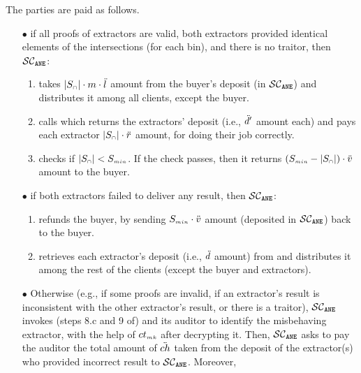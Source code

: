



\item The parties are paid as follows. 

\begin{itemize}[leftmargin=1.7mm]
%
\item[$\bullet$]  if all proofs of  extractors are valid, both extractors provided identical elements of the intersections (for each bin), and there is no traitor, then $\mathcal{SC}_{\mathtt{ANE}}$:
\begin{enumerate}[leftmargin=4.3mm]
%
 \item takes $|S_{\scriptscriptstyle\cap}|\cdot m\cdot \ddot{l}$ amount from the buyer's deposit (in $\mathcal{SC}_{\mathtt{ANE}}$) and distributes it among all clients, except the buyer. 
 \item calls \SCpc which returns the extractors' deposit (i.e., $\ddot{d}'$ amount each) and pays each extractor $|S_{\scriptscriptstyle\cap}|\cdot \ddot{r}$ amount, for doing their job correctly. 
 \item checks if $|{ { {S}}}_{\scriptscriptstyle\cap}|<S_{\scriptscriptstyle min}$. If the check passes, then it returns $(S_{\scriptscriptstyle min}-|S_{\scriptscriptstyle\cap}|)\cdot \ddot{v}$ amount  to the buyer.
 \end{enumerate}
% 
\item[$\bullet$] if both extractors failed to deliver any result, then $\mathcal{SC}_{\mathtt{ANE}}$:
%
\begin{enumerate}[leftmargin=4.3mm]
%
\item refunds the buyer, by sending $S_{\scriptscriptstyle min}\cdot \ddot{v}$ amount (deposited in $\mathcal{SC}_{\mathtt{ANE}}$) back to the buyer. 
%
\item retrieves each extractor's deposit (i.e., $\ddot{d}$ amount) from \SCpc and distributes it among the rest of the clients (except the buyer and extractors).  
%
 \end{enumerate}
 \item[$\bullet$]\label{smart-PSI-inconsistency} Otherwise (e.g., if some proofs are invalid, if an extractor's result is inconsistent with the other extractor's result, or there is a traitor), $\mathcal{SC}_{\mathtt{ANE}}$ invokes (steps 8.c and 9 of) \SCpc and its auditor to identify the misbehaving extractor, with the help of $ct_{\scriptscriptstyle mk}$ after decrypting it. Then, $\mathcal{SC}_{\mathtt{ANE}}$ asks \SCpc to pay the auditor the total amount of $\ddot{ch}$ taken from the deposit of the extractor(s) who provided incorrect result to $\mathcal{SC}_{\mathtt{ANE}}$. Moreover,
%


\end{itemize}
